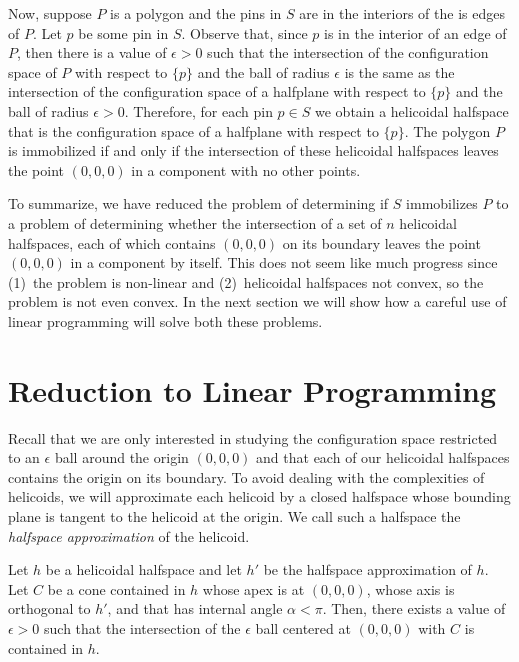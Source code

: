 \documentclass[lotsofwhite,charterfonts]{patmorin}
\begin{document}
Now, suppose $P$ is a polygon and the pins in $S$ are in the interiors of the
is edges of $P$.  Let $p$ be some pin in $S$.  Observe that, since $p$ is in
the interior of an edge of $P$, then there is a value of $\epsilon >0$ such
that the intersection of the configuration space of $P$ with respect to $\{p\}$
and the ball of radius $\epsilon$ is the same as the intersection of the
configuration space of a halfplane with respect to $\{p\}$ and the ball of
radius $\epsilon>0$. Therefore, for each pin $p\in S$ we obtain a helicoidal
halfspace that is the configuration space of a halfplane with respect to
$\{p\}$.  The polygon $P$ is immobilized if and only if the intersection of
these helicoidal halfspaces leaves the point $(0,0,0)$ in a component with no
other points. 

To summarize, we have reduced the problem of determining if $S$ immobilizes $P$
to a problem of determining whether the intersection of a set of $n$ helicoidal
halfspaces, each of which contains $(0,0,0)$ on its boundary leaves the point
$(0,0,0)$ in a component by itself.  This does not seem like much progress
since (1)~the problem is non-linear and (2)~helicoidal halfspaces not convex,
so the problem is not even convex.  In the next section we will show how a
careful use of linear programming will solve both these problems.

\section{Reduction to Linear Programming}

Recall that we are only interested in studying the configuration space
restricted to an $\epsilon$ ball around the origin $(0,0,0)$ and that each of
our helicoidal halfspaces contains the origin on its boundary.  To avoid
dealing with the complexities of helicoids, we will approximate each helicoid
by a closed halfspace whose bounding plane is tangent to the helicoid at the
origin.  We call such a halfspace the \emph{halfspace approximation} of the
helicoid.

Let $h$ be a helicoidal halfspace and let $h'$ be the halfspace approximation
of $h$.  Let $C$ be a cone contained in $h$ whose apex is at $(0,0,0)$, whose
axis is orthogonal to $h'$, and that has internal angle $\alpha <\pi$.  Then,
there exists a value of $\epsilon >0$ such that the intersection of the
$\epsilon$ ball centered at $(0,0,0)$ with $C$ is contained in $h$.  
\end{document}
